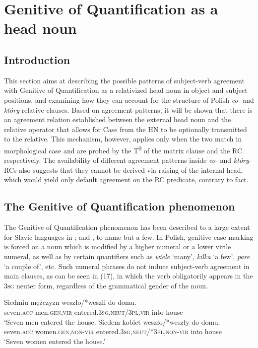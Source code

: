 \documentclass[output=paper]{langsci/langscibook}
\begin{document}
\section{Genitive of Quantification as a head noun} %

\subsection{Introduction}%

This section aims at describing the possible patterns of subject-verb agreement with Genitive of Quantification as a relativized head noun in object and subject positions, and examining how they can account for the structure of Polish \textit{co{}-} and \textit{który}{}-relative clauses. Based on agreement patterns, it will be shown that there is an agreement relation established between the external head noun and the relative operator that allows for Case from the HN to be optionally transmitted to the relative. This mechanism, however, applies only when the two match in morphological case and are probed by the T\textsuperscript{0} of the matrix clause and the RC respectively. The availability of different agreement patterns inside \textit{co{}-} and \textit{który}{}-RCs also suggests that they cannot be derived via raising of the internal head, which would yield only default agreement on the RC predicate, contrary to fact. 

\subsection{The Genitive of Quantification phenomenon}%

The Genitive of Quantification phenomenon has been described to a large extent for Slavic languages in \citet{Bošković2006,Franks1994,Franks2002,Przepiórkowski2004,Rutkowski2002}; and \citet{Willim2003}, to name but a few. In Polish, genitive case marking is forced on a noun which is modified by a higher numeral or a lower virile numeral, as well as by certain quantifiers such as \textit{wiele} ‘many’, \textit{kilka} ‘a few’, \textit{pare} ‘a couple of’, etc. Such numeral phrases do not induce subject-verb agreement in main clauses, as can be seen in (17), in which the verb obligatorily appears in the \textsc{3sg} neuter form, regardless of the grammatical gender of the noun. 

\ea%
    \label{ex:leska:17}
    \ea
    \gll Siedmiu   mężczyzn   weszło/*weszli   do   domu.\\
         seven.\textsc{acc}   men.\textsc{gen,vir}   entered.\textsc{3sg,neut/3pl,vir} into   house\\
    \glt ‘Seven men entered the house.
    \ex
    \gll Siedem   kobiet   weszło/*weszły      do domu.\\
         seven.\textsc{acc}   women.\textsc{gen,non-vir}   entered.\textsc{3sg,neut/*3pl,non-vir} into house\\
    \glt ‘Seven women entered the house.’
    \z
\z
    
\end{document}
